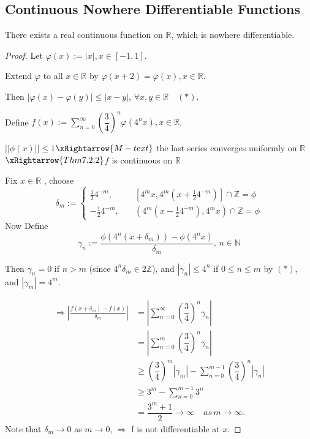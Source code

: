 \subsection{Continuous Nowhere Differentiable Functions}
\begin{theorem}
    There exists a real continuous function on $ \mathbb{R}  $, which is nowhere differentiable.
\end{theorem}
\begin{proof}
    Let  $ \varphi(x):=|x|,x\in[-1,1] $.
    
    Extend  $ \varphi  $ to all  $ x\in\mathbb{R} $ by  $ \varphi(x+2)=\varphi(x), x\in\mathbb{R} $.
    
    Then  $ |\varphi(x)-\varphi(y)| \leqslant |x-y| $,  $ \forall x,y\in\mathbb{R}\quad (\ast )$.
    
    Define $ f(x):=\sum\limits_{n=0}^{\infty} (\dfrac{3}{4})^n\varphi(4^nx),x\in\mathbb{R} $.
    
     $||\phi(x)|| \leqslant 1 $$ \xRightarrow{M-text} $ the last series converges uniformly on $ \mathbb{R } $$ \xRightarrow{Thm 7.2.2} $$ f $ is continuous on $ \mathbb{R} $
     
     Fix  $ x\in \mathbb{R } $ , choose
     \begin{equation*}
        \delta_m:=\left\{
        \begin{aligned}
            \frac{1}{2}4^{-m}, &\quad [4^mx,4^m(x+\frac{1}{2}4^{-m})]\cap \mathbb{Z}=\phi \\
            -\frac{1}{2}4^{-m},&\quad(4^m(x-\frac{1}{2}4^{-m}),4^mx)\cap \mathbb{Z }=\phi
        \end{aligned}
        \right.
     \end{equation*}
     Now Define
     \begin{equation*}
        \gamma_n:=\dfrac{\phi(4^n(x+\delta_m))-\phi(4^nx)}{\delta_m},\, n\in\mathbb{N}
     \end{equation*}

     Then  $ \gamma_n=0 $ if  $ n>m  $ (since  $ 4^n\delta_m\in2\mathbb{Z} $), and  $ |\gamma_n| \leqslant 4^n $ if  $ 0 \leqslant n \leqslant m $ by  $ (\ast) $, and  $ |\gamma_m|=4^m $.
     
     \begin{align*}
        \Rightarrow|\frac{f(x+\delta_m)-f(x)}{\delta_m}|&=|\sum\limits_{n=0}^{\infty} (\dfrac{3}{4})^n\gamma_n|\\
        &=|\sum\limits_{n=0}^{m } (\dfrac{3}{4})^n\gamma_n|\\
        &\geqslant (\dfrac{3}{4})^m|\gamma_m|-\sum\limits_{n=0}^{m-1 } (\dfrac{3}{4})^n|\gamma_n|\\
        &\geqslant 3^m-\sum\limits_{n=0}^{m-1} 3^n\\
        &=\dfrac{3^m+1}{2}\to\infty \quad as \,m\to\infty.
     \end{align*}
     Note that  $ \delta_m\to0 $  as  $ m\to0 $,  $ \Rightarrow $ f is not differentiable at  $ x $.  
\end{proof}
